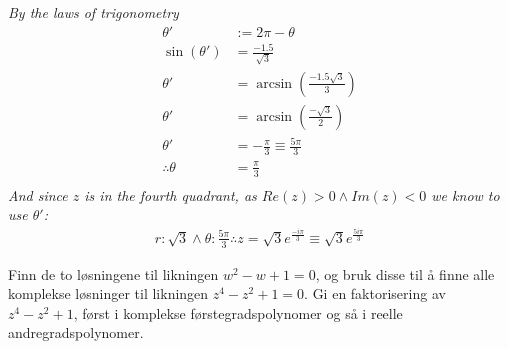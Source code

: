 \documentclass{myassignment}
\begin{document}
\begin{multicols}{2}
\begin{answer}
				\textit{\hspace*{2em}\small By the laws of trigonometry}
				\begin{align*}
					\theta' &:= 2\pi - \theta\\[1em]
					\sin(\theta') &= \frac{-1.5}{\sqrt{3}} \\
					\theta' &= \arcsin(\frac{-1.5\sqrt{3}}{3}) \\[0.5em]
					\theta' &= \arcsin(\frac{-\sqrt{3}}{2}) \\[0.5em]
					\theta' &= -\frac{\pi}{3} \equiv \frac{5\pi}{3} \\[0.5em]
					\therefore \theta  &= \frac{\pi}{3} \\
				\end{align*}
				\blackqed
				\textit{\small \hspace*{3em}And since $z$ is in the fourth quadrant, as $Re(z)>0 \land Im(z)<0$ we know to use $\theta'$:}
				\begin{align*}
					r: \sqrt{3} \land \theta: \frac{5\pi}{3} \therefore z = \sqrt{3}e^{\frac{-i\pi}{3}} \equiv \sqrt{3}e^{\frac{5i\pi}{3}}
				\end{align*}
			\end{answer}
		\end{multicols}
		\pagebreak


	\begin{problem}
		Finn de to løsningene til likningen $w^2 - w + 1 = 0$, og bruk disse til å finne alle komplekse løsninger til likningen $z^4 - z^2 + 1 = 0$. Gi en faktorisering av $z^4 - z^2 + 1$, først i komplekse førstegradspolynomer og så i reelle andregradspolynomer.
	\end{problem}
\end{document}
